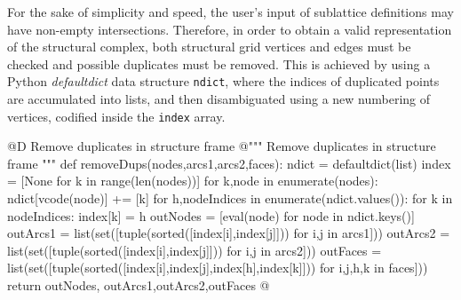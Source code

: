 \documentclass[11pt,oneside]{article}    %
\begin{document}
For the sake of simplicity and speed, the user's input of sublattice definitions may have non-empty intersections. Therefore, in order to obtain a valid representation of the structural complex, both structural grid vertices and edges must be checked and possible duplicates must be removed. This is achieved by using a Python \emph{defaultdict} data structure \texttt{ndict}, where the indices of duplicated points are accumulated into lists, and then disambiguated using a new numbering of  vertices, codified inside the \texttt{index} array.

@D Remove duplicates in structure frame 
@{""" Remove duplicates in structure frame """
def removeDups(nodes,arcs1,arcs2,faces):
    ndict = defaultdict(list)
    index = [None for k in range(len(nodes))]
    for k,node in enumerate(nodes):
        ndict[vcode(node)] += [k]
    for h,nodeIndices in enumerate(ndict.values()):
        for k in nodeIndices:
            index[k] = h
    outNodes = [eval(node) for node in ndict.keys()]
    outArcs1 = list(set([tuple(sorted([index[i],index[j]])) for i,j in arcs1]))
    outArcs2 = list(set([tuple(sorted([index[i],index[j]])) for i,j in arcs2]))
    outFaces = list(set([tuple(sorted([index[i],index[j],index[h],index[k]])) 
        for i,j,h,k in faces]))
    return outNodes, outArcs1,outArcs2,outFaces
@}
\end{document}
